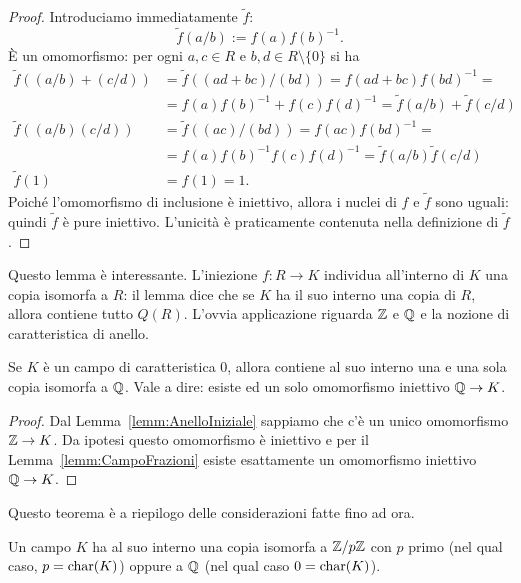 \begin{proof}
Introduciamo immediatamente $\tilde f$:
\[\tilde f(a/b) := f(a)f(b)^{-1} .\]
È un omomorfismo: per ogni $a, c \in R$ e $b, d \in R \setminus \{0\}$ si ha
\begin{align*}
\tilde{f}((a/b)+(c/d)) &= \tilde{f}((ad+bc)/(bd))=f(ad+bc)f(bd)^{-1}= \\
                       &= f(a)f(b)^{-1}+f(c)f(d)^{-1} =\tilde{f}(a/b)+\tilde{f}(c/d) \\
\tilde{f}((a/b)(c/d))  &=\tilde{f}((ac)/(bd))=f(ac)f(bd)^{-1}= \\
                       &= f(a)f(b)^{-1}f(c)f(d)^{-1}=\tilde{f}(a/b)\tilde{f}(c/d) \\
\tilde{f}(1)    &= f(1)=1 .        
\end{align*}
Poiché l'omomorfismo di inclusione è iniettivo, allora i nuclei di $f$ e $\tilde f$ sono uguali: quindi $\tilde f$ è pure iniettivo. L'unicità è praticamente contenuta nella definizione di $\tilde f$.
\end{proof}

Questo lemma è interessante. L'iniezione $f : R \to K$ individua all'interno di $K$ una copia isomorfa a $R$: il lemma dice che se $K$ ha il suo interno una copia di $R$, allora contiene tutto $Q(R)$. L'ovvia applicazione riguarda $\mathbb{Z}$ e $\mathbb{Q}$ e la nozione di caratteristica di anello.

\begin{coro}
Se $K$ è un campo di caratteristica $0$, allora contiene al suo interno una e una sola copia isomorfa a $\mathbb{Q}$. Vale a dire: esiste ed un solo omomorfismo iniettivo $\mathbb{Q} \to K$.
\end{coro}

\begin{proof}
Dal Lemma~\ref{lemm:AnelloIniziale} sappiamo che c'è un unico omomorfismo $\mathbb{Z} \to K$. Da ipotesi questo omomorfismo è iniettivo e per il Lemma~\ref{lemm:CampoFrazioni} esiste esattamente un omomorfismo iniettivo $\mathbb{Q} \to K$. 
\end{proof}

Questo teorema è a riepilogo delle considerazioni fatte fino ad ora.

\begin{teor}
Un campo $K$ ha al suo interno una copia isomorfa a $\mathbb{Z}/p\mathbb{Z}$ con $p$ primo (nel qual caso, $p = \mathrm{char}(K)$) oppure a $\mathbb{Q}$ (nel qual caso $0 = \mathrm{char}(K)$).
\end{teor}

